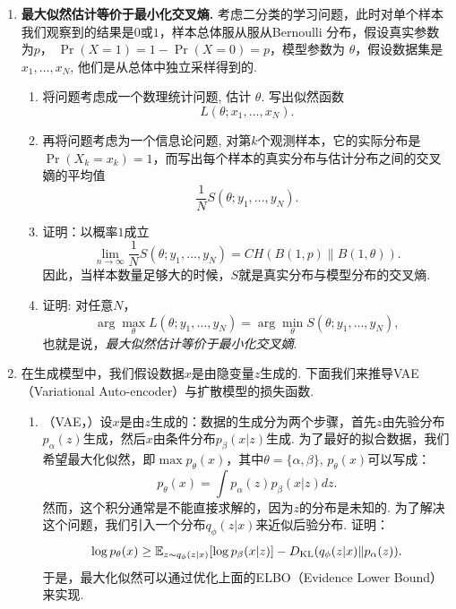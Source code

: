 \begin{enumerate}[wide, labelindent=0pt]
    \item \label{exercise:cross-entropy-maximum-likelihood} \textbf{最大似然估计等价于最小化交叉熵. }考虑二分类的学习问题，此时对单个样本我们观察到的结果是$0$或$1$，样本总体服从服从Bernoulli 分布，假设真实参数为$p$， $\Pr(X=1)=1-\Pr(X=0)=p$，模型参数为 $\theta$，假设数据集是 $x_1,\dots,x_N$, 他们是从总体中独立采样得到的.
    \begin{enumerate}
        \item 将问题考虑成一个数理统计问题, 估计 $\theta$. 写出似然函数 
        \[L(\theta ; x_1, \ldots, x_N).\]
        \item 再将问题考虑为一个信息论问题, 对第$k$个观测样本，它的实际分布是$\Pr(X_k=x_k)=1$，而写出每个样本的真实分布与估计分布之间的交叉嫡的平均值
        \[\frac{1}{N}S(\theta ; y_1, \ldots, y_N).\]
        \item 证明：以概率$1$成立
        \[\lim_{n\to\infty}\frac{1}{N}S(\theta ; y_1, \ldots, y_N)=CH(B(1,p)\| B(1,\theta)).\]
        因此，当样本数量足够大的时候，$S$就是真实分布与模型分布的交叉熵.
        \item 证明: 对任意$N$，
        \[\arg\max_\theta L(\theta ; y_1, \ldots, y_N)=\arg\min _\theta S(\theta ; y_1, \ldots, y_N),\]
        也就是说，\textit{最大似然估计等价于最小化交叉嫡}.
    \end{enumerate}

    \item \label{exercise:diffusion-model-loss}
    在生成模型中，我们假设数据$x$是由隐变量$z$生成的. 下面我们来推导VAE（Variational Auto-encoder）与扩散模型的损失函数.
    \begin{enumerate}
        \item （VAE，\cite{kingmaAutoEncodingVariationalBayes2022}）设$x$是由$z$生成的：数据的生成分为两个步骤，首先$z$由先验分布$p_{\alpha}(z)$生成，然后$x$由条件分布$p_{\beta}(x|z)$生成. 为了最好的拟合数据，我们希望最大化似然，即$\max p_{\theta}(x)$，其中$\theta = \{\alpha, \beta\}$, $p_{\theta}(x)$可以写成：
        \[
            p_{\theta}(x) = \int p_{\alpha}(z)p_{\beta}(x|z)dz.
        \]
        然而，这个积分通常是不能直接求解的，因为$z$的分布是未知的. 为了解决这个问题，我们引入一个分布$q_{\phi}(z|x)$来近似后验分布. 证明：
        \[
            \log p_{\theta}(x) \geq \mathbb{E}_{z\sim q_{\phi}(z|x)}[\log p_{\beta}(x|z)] - D_{\mathrm{KL}}(q_{\phi}(z|x)\Vert p_{\alpha}(z)).
        \]
        于是，最大化似然可以通过优化上面的ELBO（Evidence Lower Bound）来实现.


\end{enumerate}
\end{enumerate}
